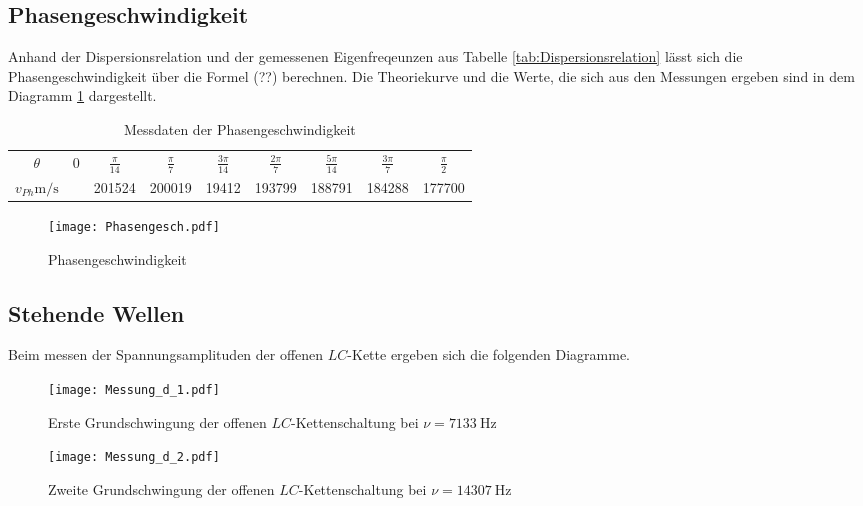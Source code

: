 \subsection{Phasengeschwindigkeit}

Anhand der Dispersionsrelation und der gemessenen Eigenfreqeunzen aus Tabelle
\ref{tab:Dispersionsrelation} lässt sich die Phasengeschwindigkeit über die
Formel (??) berechnen.
Die Theoriekurve und die Werte, die sich aus den Messungen ergeben sind in
dem Diagramm \ref{fig:Phasengesch} dargestellt.

\FloatBarrier
\tiny{
\begin{table}
 \centering
 \begin{tabular}[width=\textwidth]{S| S S S S S S S S}
    \midrule
    $\theta$ & 0 & $\frac{\pi}{14}$ & $\frac{\pi}{7}$ & $\frac{3\pi}{14}$ & $\frac{2\pi}{7}$ & $\frac{5\pi}{14}$ & $\frac{3\pi}{7}$ & $\frac{\pi}{2}$ \\
    $v_{Ph}$$\si{\meter\per\second}$ & \text{\,\,\,\,\,\,\,\,\,\,\,\,\,\,\,\,--} & 201524 & 200019 & 19412 & 193799 & 188791 & 184288 & 177700 \\
    \bottomrule
\end{tabular}
  \caption{Messdaten der Phasengeschwindigkeit}
  \label{tab:Phasengesch}
\end{table}
}
\FloatBarrier

\begin{figure}
  \texttt{[image: Phasengesch.pdf]}
  \caption{Phasengeschwindigkeit}
  \label{fig:Phasengesch}
\end{figure}

\subsection{Stehende Wellen}

Beim messen der Spannungsamplituden der offenen $LC$-Kette ergeben sich die folgenden
Diagramme.

\begin{figure}
  \texttt{[image: Messung\_d\_1.pdf]}
  \caption{Erste Grundschwingung der offenen $LC$-Kettenschaltung bei $\nu = \SI{7133}{\hertz}$}
  \label{fig:Messungd1}
\end{figure}

\begin{figure}
  \texttt{[image: Messung\_d\_2.pdf]}
  \caption{Zweite Grundschwingung der offenen $LC$-Kettenschaltung bei $\nu = \SI{14307}{\hertz}$}
  \label{fig:Messungd2}
\end{figure}

